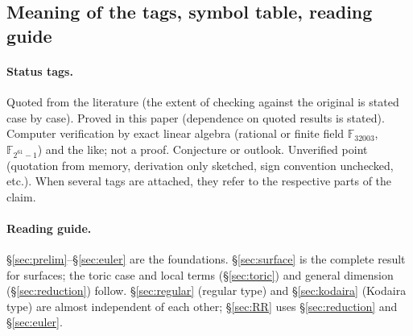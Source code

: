 \subsection{Meaning of the tags, symbol table, reading guide}\label{subsec:tags}
\paragraph{Status tags.} \tC Quoted from the literature (the extent of checking against the original is stated case by case). \tP Proved in this paper (dependence on quoted results is stated). \tV Computer verification by exact linear algebra (rational or finite field $\mathbb F_{32003}$, $\mathbb F_{2^{61}-1}$) and the like; not a proof. \tK Conjecture or outlook. \tQ Unverified point (quotation from memory, derivation only sketched, sign convention unchecked, etc.). When several tags are attached, they refer to the respective parts of the claim.

\paragraph{Reading guide.} \S\ref{sec:prelim}--\S\ref{sec:euler} are the foundations. \S\ref{sec:surface} is the complete result for surfaces; the toric case and local terms (\S\ref{sec:toric}) and general dimension (\S\ref{sec:reduction}) follow. \S\ref{sec:regular} (regular type) and \S\ref{sec:kodaira} (Kodaira type) are almost independent of each other; \S\ref{sec:RR} uses \S\ref{sec:reduction} and \S\ref{sec:euler}.

